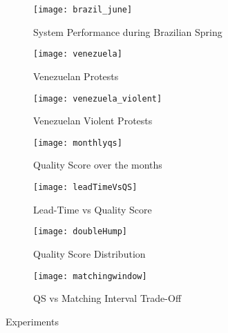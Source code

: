 %
\begin{figure*}
\centering
\begin{subfigure}{\columnwidth}
  \centering
  \texttt{[image: brazil\_june]}
  \caption{System Performance during Brazilian Spring}
  \label{fig:brazil_june}
\end{subfigure}%
\begin{subfigure}{\columnwidth}
  \centering
  \texttt{[image: venezuela]}
  \caption{Venezuelan Protests}
  \label{fig:venezuela_feb}
\end{subfigure}
\begin{subfigure}{\columnwidth}
  \centering
  \texttt{[image: venezuela\_violent]}
  \caption{Venezuelan Violent Protests}
  \label{fig:venezuela_violent}
\end{subfigure}%
\begin{subfigure}{\columnwidth}
  \centering
  \texttt{[image: monthlyqs]}
  \caption{Quality Score over the months}
  \label{fig:monthlyqs}
\end{subfigure}
\begin{subfigure}{\columnwidth}
  \centering
  \texttt{[image: leadTimeVsQS]}
  \caption{Lead-Time vs Quality Score}
  \label{fig:leadTimeVsQS}
\end{subfigure}%
\begin{subfigure}{\columnwidth}
  \centering
  \texttt{[image: doubleHump]}
  \caption{Quality Score Distribution}
  \label{fig:doubleHump}
\end{subfigure}
\begin{subfigure}{\columnwidth}
  \centering
  \texttt{[image: matchingwindow]}
  \caption{QS vs Matching Interval Trade-Off}
  \label{fig:matchinginterval}
\end{subfigure}%
\caption{Experiments}
\end{figure*}


